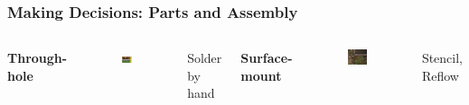 \documentclass{beamer}
\begin{document}
\begin{frame}
\frametitle{Making Decisions: Parts and Assembly}
\begin{columns}[t] %

\centerline{\textbf{Through-hole}}
\begin{figure}
\includegraphics[width=0.8\linewidth]{th.jpg}
\end{figure}
\centerline{Solder by hand}

\centerline{\textbf{Surface-mount}}
\begin{figure}
\includegraphics[width=0.8\linewidth]{smt.jpg}
\end{figure}
\centerline{Stencil, Reflow}

\end{columns}
\end{frame}
\end{document}
